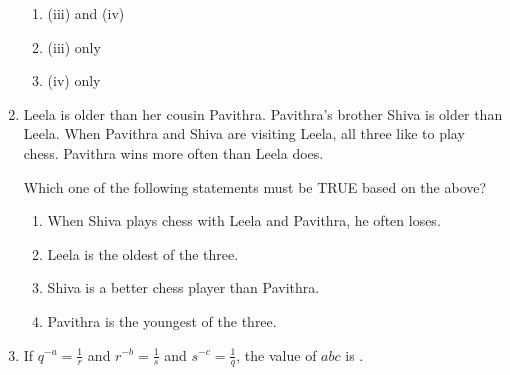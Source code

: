 \documentclass[journal,11pt,onecolumn]{IEEEtran}
\begin{document}
\begin{enumerate}[resume]
\begin{enumerate}
              \item (iii) and (iv)

              \item (iii) only

              \item (iv) only

          \end{enumerate}

    \item Leela is older than her cousin Pavithra. Pavithra's brother Shiva is older than Leela. When Pavithra and Shiva are visiting Leela, all three like to play chess. Pavithra wins more often than Leela does.

          Which one of the following statements must be TRUE based on the above?

          \begin{enumerate}

              \item When Shiva plays chess with Leela and Pavithra, he often loses.

              \item Leela is the oldest of the three.

              \item Shiva is a better chess player than Pavithra.

              \item Pavithra is the youngest of the three.

          \end{enumerate}

    \item If $q^{-a}=\frac{1}{r}$ and $r^{-b}=\frac{1}{s}$ and $s^{-c}=\frac{1}{q}$, the value of $abc$ is \underline{\hspace{2cm}}.

          \begin{enumerate}



\end{enumerate}
\end{enumerate}
\end{document}
